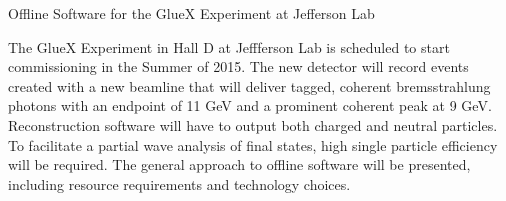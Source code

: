 Offline Software for the GlueX Experiment at Jefferson Lab

The GlueX Experiment in Hall D at Jeffferson Lab is scheduled to start
commissioning in the Summer of 2015. The new detector will record
events created with a new beamline that will deliver tagged, coherent
bremsstrahlung photons with an endpoint of 11 GeV and a prominent
coherent peak at 9 GeV. Reconstruction software will have to output
both charged and neutral particles. To facilitate a partial wave
analysis of final states, high single particle efficiency will be
required. The general approach to offline software will
be presented, including resource requirements and technology choices.
